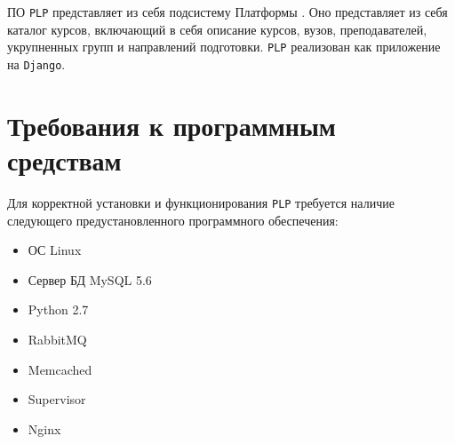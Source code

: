 ПО \texttt{PLP} представляет из себя подсистему Платформы . Оно представляет из себя каталог курсов, включающий в себя описание курсов, вузов, преподавателей, укрупненных групп и направлений подготовки.
\texttt{PLP} реализован как приложение на \texttt{Django}.

\section{Требования к программным средствам}
Для корректной установки и функционирования \texttt{PLP} требуется наличие следующего предустановленного программного обеспечения:

\begin{itemize}
	\item ОС Linux
	\item Сервер БД MySQL 5.6
	\item Python 2.7
	\item RabbitMQ
	\item Memcached
	\item Supervisor
	\item Nginx
\end{itemize}

